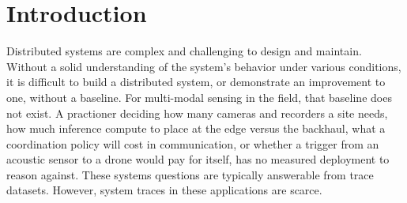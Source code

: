 \documentclass[sigconf]{acmart}
\newif\ifreviewmode
\begin{document}


\maketitle
\ifreviewmode
  \noindent{\footnotesize\textcolor{red}{Draft last updated 2026-10-22 \textbullet{} snapshot \texttt{darwin\_core\_latest\_20261008}}}\par
\fi
\pagestyle{plain}

\ifreviewmode
  \begingroup
  \setcounter{tocdepth}{2}
  \footnotesize
  \tableofcontents
  \endgroup
\fi

\section{Introduction}
\label{sec:introduction}

Distributed systems are complex and challenging to design and maintain. 
Without a solid understanding of the system's behavior under various conditions, it is difficult to build a distributed system, or demonstrate an improvement to one, without a baseline. 
For multi-modal sensing in the field, that baseline does not exist. 
A practioner deciding how many cameras and recorders a site needs, how much inference compute to place at the edge versus the backhaul, what a coordination policy will cost in communication, or whether a trigger from an acoustic sensor to a drone would pay for itself, has no measured deployment to reason against.
These systems questions are typically answerable from trace datasets.
However, system traces in these applications are scarce. 
\end{document}
